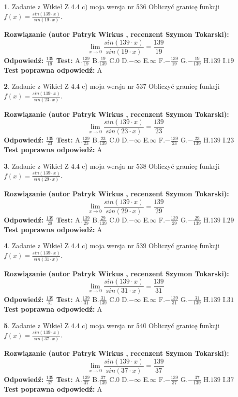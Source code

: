 \documentclass[12pt, a4paper]{article}
\theoremstyle{definition} %
\newtheorem{zad}{}
\newcommand{\zadStart}[1]{\begin{zad}#1\newline}
\newcommand{\zadStop}{\end{zad}}
\newcommand{\rozwStart}[2]{\noindent \textbf{Rozwiązanie (autor #1 , recenzent #2): }\newline}
\newcommand{\rozwStop}{\newline}
\newcommand{\odpStart}{\noindent \textbf{Odpowiedź:}\newline}
\newcommand{\odpStop}{\newline}
\newcommand{\testStart}{\noindent \textbf{Test:}\newline}
\newcommand{\testStop}{\newline}
\newcommand{\kluczStart}{\noindent \textbf{Test poprawna odpowiedź:}\newline}
\newcommand{\kluczStop}{\newline}
\begin{document}
\zadStart{Zadanie z Wikieł Z 4.4 c) moja wersja nr 536}
Obliczyć granicę funkcji $f(x)=\frac{sin(139\cdot x)}{sin(19\cdot x)}$.
\zadStop
\rozwStart{Patryk Wirkus}{Szymon Tokarski}
$$\lim\limits_{x\to 0}\frac{sin(139\cdot x)}{sin(19\cdot x)}=
\frac{139}{19}$$
\rozwStop
\odpStart
$\frac{139}{19}$
\odpStop
\testStart
A.$\frac{139}{19}$
B.$\frac{19}{139}$
C.$0$
D.$-\infty$
E.$\infty$
F.$-\frac{139}{19}$
G.$-\frac{19}{139}$
H.$139$
I.$19$
\testStop
\kluczStart
A
\kluczStop



\zadStart{Zadanie z Wikieł Z 4.4 c) moja wersja nr 537}
Obliczyć granicę funkcji $f(x)=\frac{sin(139\cdot x)}{sin(23\cdot x)}$.
\zadStop
\rozwStart{Patryk Wirkus}{Szymon Tokarski}
$$\lim\limits_{x\to 0}\frac{sin(139\cdot x)}{sin(23\cdot x)}=
\frac{139}{23}$$
\rozwStop
\odpStart
$\frac{139}{23}$
\odpStop
\testStart
A.$\frac{139}{23}$
B.$\frac{23}{139}$
C.$0$
D.$-\infty$
E.$\infty$
F.$-\frac{139}{23}$
G.$-\frac{23}{139}$
H.$139$
I.$23$
\testStop
\kluczStart
A
\kluczStop



\zadStart{Zadanie z Wikieł Z 4.4 c) moja wersja nr 538}
Obliczyć granicę funkcji $f(x)=\frac{sin(139\cdot x)}{sin(29\cdot x)}$.
\zadStop
\rozwStart{Patryk Wirkus}{Szymon Tokarski}
$$\lim\limits_{x\to 0}\frac{sin(139\cdot x)}{sin(29\cdot x)}=
\frac{139}{29}$$
\rozwStop
\odpStart
$\frac{139}{29}$
\odpStop
\testStart
A.$\frac{139}{29}$
B.$\frac{29}{139}$
C.$0$
D.$-\infty$
E.$\infty$
F.$-\frac{139}{29}$
G.$-\frac{29}{139}$
H.$139$
I.$29$
\testStop
\kluczStart
A
\kluczStop



\zadStart{Zadanie z Wikieł Z 4.4 c) moja wersja nr 539}
Obliczyć granicę funkcji $f(x)=\frac{sin(139\cdot x)}{sin(31\cdot x)}$.
\zadStop
\rozwStart{Patryk Wirkus}{Szymon Tokarski}
$$\lim\limits_{x\to 0}\frac{sin(139\cdot x)}{sin(31\cdot x)}=
\frac{139}{31}$$
\rozwStop
\odpStart
$\frac{139}{31}$
\odpStop
\testStart
A.$\frac{139}{31}$
B.$\frac{31}{139}$
C.$0$
D.$-\infty$
E.$\infty$
F.$-\frac{139}{31}$
G.$-\frac{31}{139}$
H.$139$
I.$31$
\testStop
\kluczStart
A
\kluczStop



\zadStart{Zadanie z Wikieł Z 4.4 c) moja wersja nr 540}
Obliczyć granicę funkcji $f(x)=\frac{sin(139\cdot x)}{sin(37\cdot x)}$.
\zadStop
\rozwStart{Patryk Wirkus}{Szymon Tokarski}
$$\lim\limits_{x\to 0}\frac{sin(139\cdot x)}{sin(37\cdot x)}=
\frac{139}{37}$$
\rozwStop
\odpStart
$\frac{139}{37}$
\odpStop
\testStart
A.$\frac{139}{37}$
B.$\frac{37}{139}$
C.$0$
D.$-\infty$
E.$\infty$
F.$-\frac{139}{37}$
G.$-\frac{37}{139}$
H.$139$
I.$37$
\testStop
\kluczStart
A
\kluczStop
\end{document}
